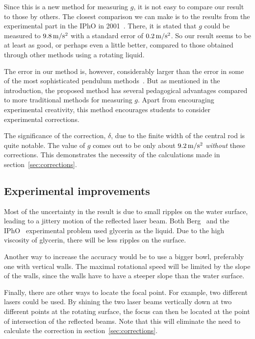 \documentclass[11pt, a4paper, twocolumn, swedish, english]{article}
\begin{document}
Since this is a new method for measuring $g$, it is not
easy to compare our result to those by others. The closest
comparison we can make is to the results from the experimental part in 
the IPhO in 2001~\cite{IPhO2001}. There, it is stated that $g$ could be measured to $\unit[9.8]{m/s^2}$ with a standard error of $\unit[0.2]{m/s^2}$. So our result seems to be at least as good, or perhaps even a little better, compared to those obtained through other methods using a rotating liquid. 

The error in our method is, however, considerably larger than
the error in some of the most sophisticated pendulum methods~\cite{Candela2001}. 
But as mentioned in the introduction, the proposed method has several pedagogical advantages
compared to more traditional methods for measuring $g$. Apart from encouraging
experimental creativity, this method encourages students to consider experimental corrections. 

The significance of the correction, $\delta$, due to the finite width of the central
rod is quite notable. The value of $g$ comes out to be only
about $\unit[9.2]{m/s^2}$ \emph{without} these corrections. This
demonstrates the necessity of the calculations made in
section~\ref{sec:corrections}. 

\subsection{Experimental improvements}

Most of the uncertainty in the result is due to small ripples on the
water surface, leading to a jittery motion of the reflected
laser beam. Both Berg~\cite{Berg1990} and the IPhO~\cite{IPhO2001} experimental problem used
glycerin as the liquid. Due to the high viscosity
of glycerin, there will be less ripples on the surface.

Another way to increase the accuracy would be to use a bigger bowl,
preferably one with vertical walls. The maximal rotational
speed will be limited by the slope of the walls, since the walls have
to have a steeper slope than the water surface.

Finally, there are other ways to locate the focal point. For example, two
different lasers could be used. By shining the two laser beams
vertically down at two different points at the rotating surface, the
focus can then be located at the point of intersection of the reflected
beams. Note that this will eliminate the need to calculate the correction in
section~\ref{sec:corrections}. 
\end{document}
